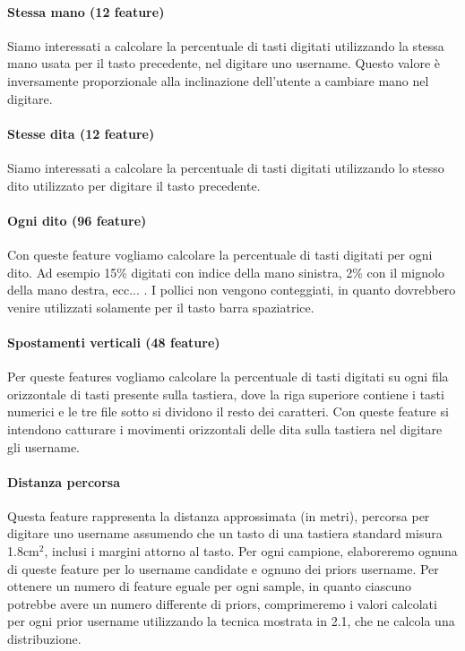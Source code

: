 \paragraph{Stessa mano (12 feature)}
Siamo interessati a calcolare la percentuale di tasti digitati utilizzando la stessa mano usata per il tasto precedente, nel digitare uno username. Questo valore è inversamente proporzionale alla inclinazione dell'utente a cambiare mano nel digitare.

\paragraph{Stesse dita (12 feature)}
Siamo interessati a calcolare la percentuale di tasti digitati utilizzando lo stesso dito utilizzato per digitare il tasto precedente.

\paragraph{Ogni dito (96 feature)}
Con queste feature vogliamo calcolare la percentuale di tasti digitati per ogni dito. Ad esempio 15\% digitati con indice della mano sinistra, 2\% con il mignolo della mano destra, ecc... . I pollici non vengono conteggiati, in quanto dovrebbero venire utilizzati solamente per il tasto barra spaziatrice.

\paragraph{Spostamenti verticali (48 feature)}
Per queste features vogliamo calcolare la percentuale di tasti digitati su ogni fila orizzontale di tasti presente sulla tastiera, dove la riga superiore contiene i tasti numerici e le tre file sotto si dividono il resto dei caratteri. Con queste feature si intendono catturare i movimenti orizzontali delle dita sulla tastiera nel digitare gli username.

\paragraph{Distanza percorsa}
Questa feature rappresenta la distanza approssimata (in metri), percorsa per digitare uno username assumendo che un tasto di una tastiera standard misura 1.8cm$^2$, inclusi i margini attorno al tasto.\newline \newline
Per ogni campione, elaboreremo ognuna di queste feature per lo username candidate e ognuno dei priors username. Per ottenere un numero di feature eguale per ogni sample, in quanto ciascuno potrebbe avere un numero differente di priors, comprimeremo i valori calcolati per ogni prior username utilizzando la tecnica mostrata in 2.1, che ne calcola una distribuzione.


